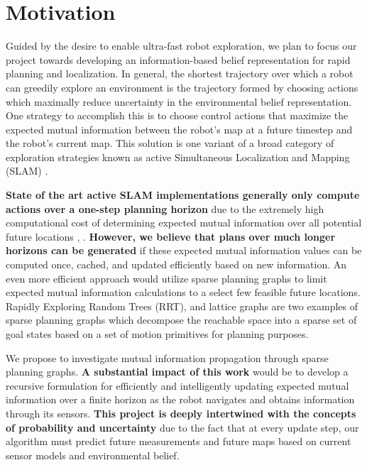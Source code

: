 \section{Motivation}

Guided by the desire to enable ultra-fast robot exploration, we plan to focus our project towards developing an information-based belief representation for rapid planning and localization. In general, the shortest trajectory over which a robot can greedily explore an environment is the trajectory formed by choosing actions which maximally reduce uncertainty in the environmental belief representation. One strategy to accomplish this is to choose control actions that maximize the expected mutual information between the robot's map at a future timestep and the robot's current map. This solution is one variant of a broad category of exploration strategies known as active Simultaneous Localization and Mapping (SLAM) \cite{thrun2005probabilistic}.

{\bf State of the art active SLAM implementations generally only compute actions over a one-step planning horizon} due to the extremely high computational cost of determining expected mutual information over all potential future locations \cite{bourgault2002information}, \cite{stachniss2005information}. {\bf However, we believe that plans over much longer horizons can be generated} if these expected mutual information values can be computed once, cached, and updated efficiently based on new information. An even more efficient approach would utilize sparse planning graphs to limit expected mutual information calculations to a select few feasible future locations. Rapidly Exploring Random Trees (RRT), and lattice graphs are two examples of sparse planning graphs which decompose the reachable space into a sparse set of goal states based on a set of motion primitives for planning purposes.

We propose to investigate mutual information propagation through sparse planning graphs. {\bf A substantial impact of this work} would be to develop a recursive formulation for efficiently and intelligently updating expected mutual information over a finite horizon as the robot navigates and obtains information through its sensors. {\bf This project is deeply intertwined with the concepts of probability and uncertainty} due to the fact that at every update step, our algorithm must predict future measurements and future maps based on current sensor models and environmental belief.
